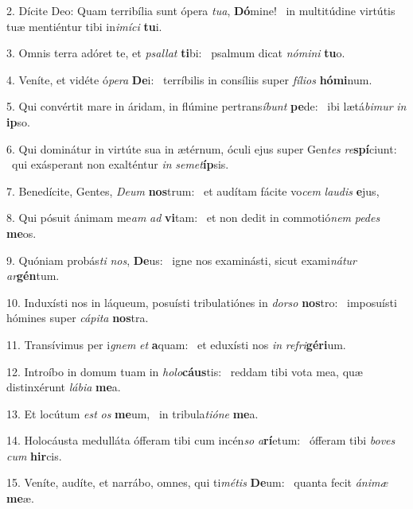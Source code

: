 2. Dícite Deo: Quam terribília sunt ópera \textit{tu}\textit{a}, \textbf{Dó}mine! \ast\  in multitúdine virtútis tuæ mentiéntur tibi in\textit{i}\textit{mí}\textit{ci} \textbf{tu}i.\

3. Omnis terra adóret te, et \textit{psal}\textit{lat} \textbf{ti}bi: \ast\  psalmum dicat \textit{nó}\textit{mi}\textit{ni} \textbf{tu}o.\

4. Veníte, et vidéte ó\textit{pe}\textit{ra} \textbf{De}i: \ast\  terríbilis in consíliis super \textit{fí}\textit{li}\textit{os} \textbf{hó}\textbf{mi}num.\

5. Qui convértit mare in áridam, in flúmine pertrans\textit{í}\textit{bunt} \textbf{pe}de: \ast\  ibi lætá\textit{bi}\textit{mur} \textit{in} \textbf{ip}so.\

6. Qui dominátur in virtúte sua in ætérnum, óculi ejus super Gen\textit{tes} \textit{re}\textbf{spí}ciunt: \ast\  qui exásperant non exalténtur \textit{in} \textit{se}\textit{met}\textbf{íp}sis.\

7. Benedícite, Gentes, \textit{De}\textit{um} \textbf{nos}trum: \ast\  et audítam fácite vo\textit{cem} \textit{lau}\textit{dis} \textbf{e}jus,\

8. Qui pósuit ánimam me\textit{am} \textit{ad} \textbf{vi}tam: \ast\  et non dedit in commotió\textit{nem} \textit{pe}\textit{des} \textbf{me}os.\

9. Quóniam probás\textit{ti} \textit{nos}, \textbf{De}us: \ast\  igne nos examinásti, sicut exami\textit{ná}\textit{tur} \textit{ar}\textbf{gén}tum.\

10. Induxísti nos in láqueum, posuísti tribulatiónes in \textit{dor}\textit{so} \textbf{nos}tro: \ast\  imposuísti hómines super \textit{cá}\textit{pi}\textit{ta} \textbf{nos}tra.\

11. Transívimus per i\textit{gnem} \textit{et} \textbf{a}quam: \ast\  et eduxísti nos \textit{in} \textit{re}\textit{fri}\textbf{gé}\textbf{ri}um.\

12. Introíbo in domum tuam in \textit{ho}\textit{lo}\textbf{cáus}tis: \ast\  reddam tibi vota mea, quæ distinxérunt \textit{lá}\textit{bi}\textit{a} \textbf{me}a.\

13. Et locútum \textit{est} \textit{os} \textbf{me}um, \ast\  in tribula\textit{ti}\textit{ó}\textit{ne} \textbf{me}a.\

14. Holocáusta medulláta ófferam tibi cum incén\textit{so} \textit{a}\textbf{rí}etum: \ast\  ófferam tibi \textit{bo}\textit{ves} \textit{cum} \textbf{hir}cis.\

15. Veníte, audíte, et narrábo, omnes, qui ti\textit{mé}\textit{tis} \textbf{De}um: \ast\  quanta fecit \textit{á}\textit{ni}\textit{mæ} \textbf{me}æ.\


